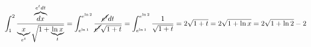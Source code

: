 \documentclass[../rgr1.tex]{subfiles}
\begin{document}
\Solution

\begin{dmath}
	\int_1^2\frac{\overbrace{dx}^{e^tdt}}{\underbrace{x}_{e^t}\sqrt{1+\underbrace{\ln x}_t}}
	= \int_{e^{\ln1}}^{e^{\ln2}}\frac{\cancel{e^t} dt}{\cancel{e^t}\sqrt{1+t}}
	= \int_{e^{\ln1}}^{e^{\ln2}}\frac{1}{\sqrt{1+t}}
	= 2 \sqrt{1+t}
	= 2 \sqrt{1+\ln x}
	= 2\sqrt{1+\ln 2} - 2
\end{dmath}

\end{document}

